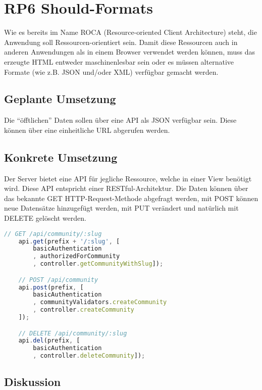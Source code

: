 \section{RP6 Should-Formats}
\label{sec:principle-rp6-should-formats}
Wie es bereits im Name ROCA (Resource-oriented Client Architecture) steht, die Anwendung soll Ressourcen-orientiert sein. Damit diese Ressourcen auch in anderen Anwendungen als in einem Browser verwendet werden können, muss das erzeugte HTML entweder maschinenlesbar sein oder es müssen alternative Formate (wie z.B. JSON und/oder XML) verfügbar gemacht werden.

\subsection*{Geplante Umsetzung}
Die ``öfftlichen'' Daten sollen über eine API als JSON verfügbar sein. Diese können über eine einheitliche URL abgerufen werden.


\subsection*{Konkrete Umsetzung}
Der Server bietet eine API für jegliche Ressource, welche in einer View benötigt wird. Diese API entspricht einer RESTful-Architektur. Die Daten können über das bekannte GET HTTP-Request-Methode abgefragt werden, mit POST können neue Datensätze hinzugefügt werden, mit PUT verändert und natürlich mit DELETE gelöscht werden.

\begin{lstlisting}[language=JavaScript, firstnumber=39, caption=Definition der API \cite{RoomiesExampleApi}, label=lst:apiRoomies]
	// GET /api/community/:slug
	api.get(prefix + '/:slug', [
		basicAuthentication
		, authorizedForCommunity
		, controller.getCommunityWithSlug]);

	// POST /api/community
	api.post(prefix, [
		basicAuthentication
		, communityValidators.createCommunity
		, controller.createCommunity
	]);

	// DELETE /api/community/:slug
	api.del(prefix, [
		basicAuthentication
		, controller.deleteCommunity]);
\end{lstlisting}


\subsection*{Diskussion}
